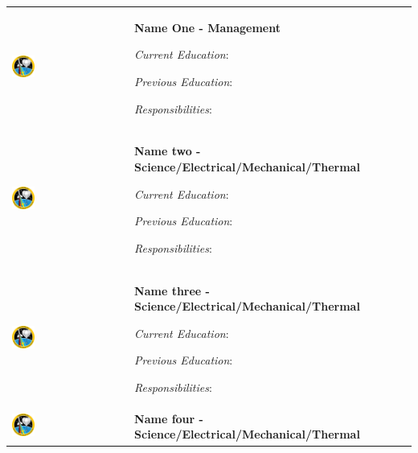 

\begin{longtable}[]{m{} m{}}


\includegraphics[width=0.2\textwidth]{0-cover/img/logo-rexus-bexus.png} & \textbf{Name One - Management}

\smallskip
\textit{Current Education}: 

\smallskip
\textit{Previous Education}:

\smallskip
\textit{Responsibilities}:  
\bigskip
\\

 \includegraphics[width=0.2\textwidth]{0-cover/img/logo-rexus-bexus.png}  & \textbf{Name two - Science/Electrical/Mechanical/Thermal}

\smallskip
\textit{Current Education}: 

\smallskip
\textit{Previous Education}:

\smallskip
\textit{Responsibilities}:                           
\bigskip
\\

 \includegraphics[width=0.2\textwidth]{0-cover/img/logo-rexus-bexus.png}  & \textbf{Name three - Science/Electrical/Mechanical/Thermal}

\smallskip
\textit{Current Education}: 

\smallskip
\textit{Previous Education}:

\smallskip
\textit{Responsibilities}:                           
\bigskip
\\
 \includegraphics[width=0.2\textwidth]{0-cover/img/logo-rexus-bexus.png}  & \textbf{Name four - Science/Electrical/Mechanical/Thermal}


\end{longtable}
